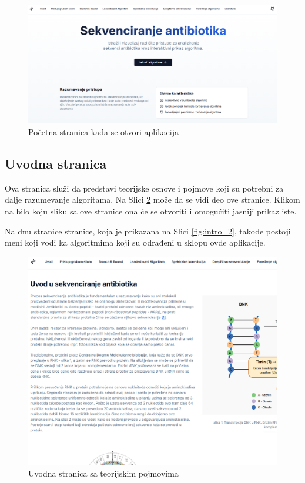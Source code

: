 \documentclass[12pt,oneside]{memoir}
\begin{document}
\begin{figure}[H]
\centering
\includegraphics[width=1\textwidth]{images/landing_page.png}
\caption{Početna stranica kada se otvori aplikacija}
\label{fig:landing_page}
\end{figure}

\subsection{Uvodna stranica}

Ova stranica služi da predstavi teorijske osnove i pojmove koji su potrebni za dalje razumevanje algoritama. Na Slici \ref{fig:intro_1} može da se vidi deo ove stranice. Klikom na bilo koju sliku sa ove stranice ona će se otvoriti i omogućiti jasniji prikaz iste.

Na dnu stranice stranice, koja je prikazana na Slici \ref{fig:intro_2}, takođe postoji meni koji vodi ka algoritmima koji su odrađeni u sklopu ovde aplikacije.

\begin{figure}[H]
\centering
\includegraphics[width=1\textwidth]{images/intro_1.png}
\caption{Uvodna stranica sa teorijskim pojmovima}
\label{fig:intro_1}
\end{figure}
\end{document}
